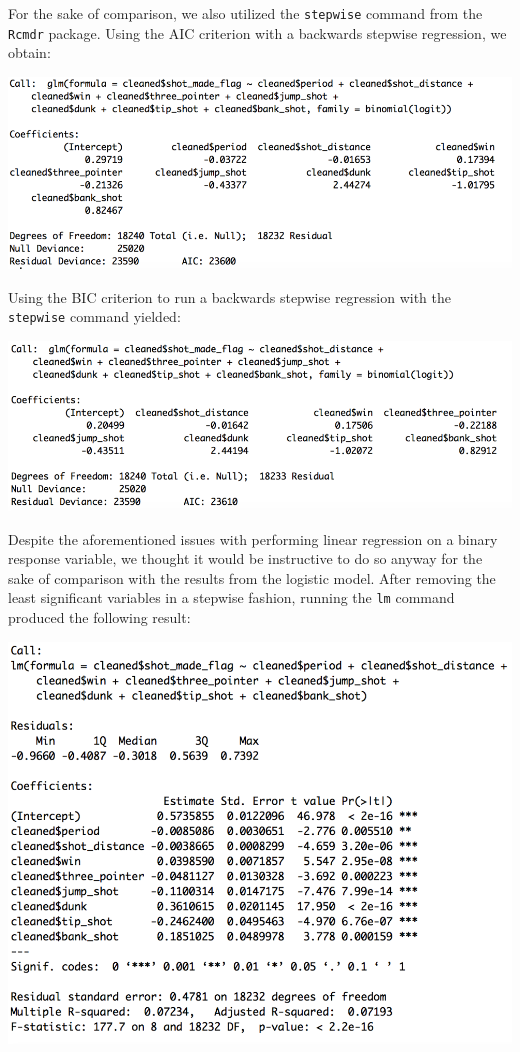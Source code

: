 \documentclass[paper=a4, fontsize=11pt]{scrartcl} %
\numberwithin{equation}{section} %
\numberwithin{figure}{section} %
\numberwithin{table}{section} %
\begin{document}
\hspace*{1cm} For the sake of comparison, we also utilized the \texttt{stepwise} command from the \texttt{Rcmdr}
package. Using the AIC criterion with a backwards stepwise regression, we obtain: 
\begin{center}
	\includegraphics[width=14cm]{img/logitaic}
\end{center}
\hspace*{1cm}Using the BIC criterion to run a backwards stepwise regression with the \texttt{stepwise} command yielded:
\begin{center}
	\includegraphics[width=14cm]{img/logitbic}
\end{center}
\hspace*{1cm} Despite the aforementioned issues with performing linear regression on a binary response variable, we thought it would be instructive to do so anyway for the sake of comparison with the results from the logistic model. After removing the least significant variables in a stepwise fashion, running the \texttt{lm} command produced the following result: 
\begin{center}
	\includegraphics[width=14cm]{img/lm1}
\end{center}
\end{document}

